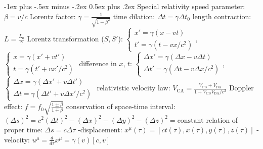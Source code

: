 \documentclass[10pt,landscape]{article}
\makeatletter
\renewcommand{\subsection}{\@startsection{subsection}{2}{0mm}%
                                {-1ex plus -.5ex minus -.2ex}%
                                {0.5ex plus .2ex}%
                                {\normalfont\normalsize\bfseries}}
\newcommand{\spc}{\hspace*{1em}}
\makeatother
\begin{document}
\begin{multicols}{3}
\subsection{Special relativity}
speed parameter: $\beta =v/c$
\newline
Lorentz factor: $\gamma =\frac{1}{\sqrt{1-\beta ^2}}$
\newline
time dilation: $\Delta t =\gamma \Delta t _0$
\newline
length contraction: $L=\frac{L_0}{\gamma }$
\newline \newline
Lorentz transformation ($S,S'$):
\newline
\spc $\left\{\begin{array}{l}
x'=\gamma (x-vt) \\ t'=\gamma (t-vx/c^2)
\end{array}\right.$, $\left\{\begin{array}{l}
x=\gamma (x'+vt')\\ t=\gamma (t'+vx'/c^2)
\end{array}\right.$
\newline
difference in $x$, $t$:
\newline
\spc $\left\{\begin{array}{l}
\Delta x'=\gamma (\Delta x-v\Delta t)\\ \Delta t'=\gamma (\Delta t-v\Delta x/c^2)
\end{array}\right.$, $\left\{\begin{array}{l}
\Delta x=\gamma (\Delta x'+v\Delta t') \\ \Delta t=\gamma (\Delta t'+v\Delta x'/c^2)
\end{array}\right.$
\newline
relativistic velocity law: $V_{\textrm{CA}}=\frac{V_{\textrm{CB}}+V_{\textrm{BA}}}{1+V_{\textrm{CB}}V_{\textrm{BA}}/c^2}$
\newline
Doppler effect: $f=f_0\sqrt{\frac{1\pm \beta }{1\mp \beta }}$
\newline \newline
conservation of space-time interval: 
\newline
\spc $(\Delta s)^2=c^2(\Delta t)^2-(\Delta x)^2-(\Delta y)^2-(\Delta z)^2=\textrm{constant}$
\newline
relation of proper time: $\Delta s=c\Delta \tau$
-displacement: $x^{\mu}(\tau)=[ct(\tau),x(\tau),y(\tau),z(\tau)]$
-velocity: $u^{\mu}=\frac{d}{d\tau}x^{\mu}=\gamma(v)[c,v]$

\end{multicols}
\end{document}
